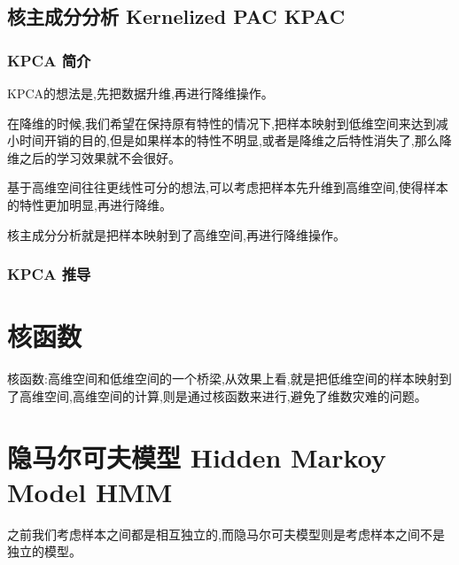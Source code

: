 \documentclass[UTF8,a4paper]{ctexart}%
\begin{document}
      \subsection{核主成分分析 Kernelized PAC KPAC}
          \subsubsection{KPCA 简介}
              KPCA的想法是,先把数据升维,再进行降维操作。

              {\color{blue}
              在降维的时候,我们希望在保持原有特性的情况下,把样本映射到低维空间来达到减小时间开销的目的,但是如果样本的特性不明显,或者是降维之后特性消失了,那么降维之后的学习效果就不会很好。

              基于高维空间往往更线性可分的想法,可以考虑把样本先升维到高维空间,使得样本的特性更加明显,再进行降维。

              核主成分分析就是把样本映射到了高维空间,再进行降维操作。
              }

          \subsubsection{KPCA 推导}


    \section{核函数}
        核函数:高维空间和低维空间的一个桥梁,从效果上看,就是把低维空间的样本映射到了高维空间,高维空间的计算,则是通过核函数来进行,避免了维数灾难的问题。

    \section{隐马尔可夫模型 Hidden Markoy Model HMM}
        {\color{blue}
          之前我们考虑样本之间都是相互独立的,而隐马尔可夫模型则是考虑样本之间不是独立的模型。
        }
\end{document}
